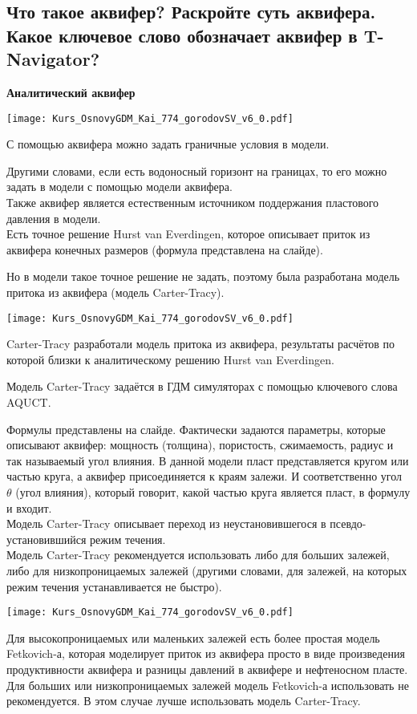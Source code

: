 

\subsection{Что такое аквифер? Раскройте суть аквифера. Какое ключевое слово обозначает аквифер в T-Navigator?}

\textbf{Аналитический аквифер}

\texttt{[image: Kurs\_OsnovyGDM\_Kai\_774\_gorodovSV\_v6\_0.pdf]}

С помощью аквифера можно задать граничные условия в модели.

Другими словами, если есть водоносный горизонт на границах, то его можно задать в модели с помощью модели аквифера.
\\

Также аквифер является естественным источником поддержания пластового давления в модели.
\\

Есть точное решение Hurst van Everdingen, которое описывает приток из аквифера конечных размеров (формула представлена на слайде).

Но в модели такое точное решение не задать, поэтому была разработана модель притока из аквифера (модель Carter-Tracy).

\texttt{[image: Kurs\_OsnovyGDM\_Kai\_774\_gorodovSV\_v6\_0.pdf]}

Carter-Tracy разработали модель притока из аквифера, результаты расчётов по которой близки к аналитическому решению Hurst van Everdingen.

Модель Carter-Tracy задаётся в ГДМ симуляторах с помощью ключевого слова AQUCT.

Формулы представлены на слайде.
Фактически задаются параметры, которые описывают аквифер: мощность (толщина), пористость, сжимаемость, радиус и так называемый угол влияния.
В данной модели пласт представляется кругом или частью круга, а аквифер присоединяется к краям залежи.
И соответственно угол $\theta$ (угол влияния), который говорит, какой частью круга является пласт, в формулу и входит.
\\

Модель Carter-Tracy описывает переход из неустановившегося в псевдо-установившийся режим течения. 
\\

Модель Carter-Tracy рекомендуется использовать либо для больших залежей, либо для низкопроницаемых залежей (другими словами, для залежей, на которых режим течения устанавливается не быстро).

\texttt{[image: Kurs\_OsnovyGDM\_Kai\_774\_gorodovSV\_v6\_0.pdf]}

Для высокопроницаемых или маленьких залежей есть более простая модель Fetkovich-а, которая моделирует приток из аквифера просто в виде произведения продуктивности аквифера и разницы давлений в аквифере и нефтеносном пласте.
\\

Для больших или низкопроницаемых залежей модель Fetkovich-а использовать не рекомендуется. В этом случае лучше использовать модель Carter-Tracy.


